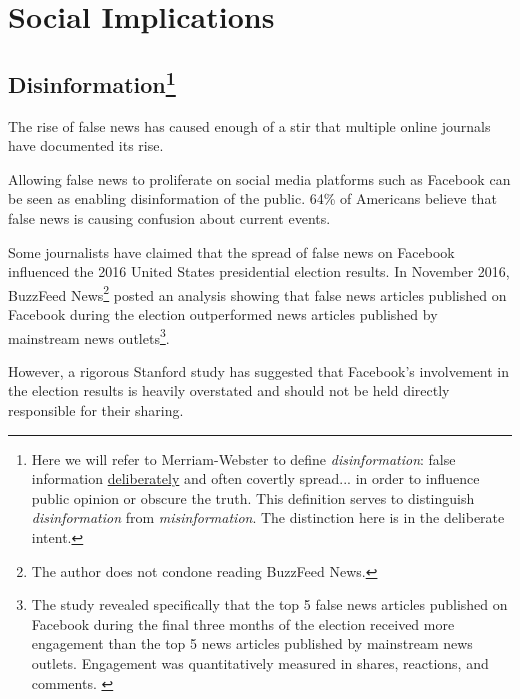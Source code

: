
\section{Social Implications}


\subsection[Disinformation]{Disinformation\footnote{Here we will refer to Merriam-Webster to define \emph{disinformation}: false information \ul{deliberately} and often covertly spread... in order to influence public opinion or obscure the truth. \cite{dictionary} This definition serves to distinguish \emph{disinformation} from \emph{misinformation}. The distinction here is in the deliberate intent.}
}

\par The rise of false news has caused enough of a stir that multiple online journals have documented its rise. \cite{telegraph_fake_news,npr_fake_news}

\par Allowing false news to proliferate on social media platforms such as Facebook can be seen as enabling disinformation of the public. 64\% of Americans believe that false news is causing confusion about current events. \cite{pew_fn_confusion}

\par Some journalists have claimed that the spread of false news on Facebook influenced the 2016 United States presidential election results. \cite{npr_fake_news} In November 2016, BuzzFeed News\footnote{The author does not condone reading BuzzFeed News.} posted an analysis showing that false news articles published on Facebook during the election outperformed news articles published by mainstream news outlets\footnote{The study revealed specifically that the top 5 false news articles published on Facebook during the final three months of the election received more engagement than the top 5 news articles published by mainstream news outlets. Engagement was quantitatively measured in shares, reactions, and comments. \cite{buzzfeed_news_analysis}}. \cite{buzzfeed_news_analysis}

\par However, a rigorous Stanford study has suggested that Facebook's involvement in the election results is heavily overstated and should not be held directly responsible for their sharing. \cite{stanford_fake_news_study}

